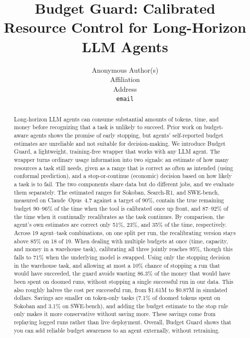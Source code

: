 \documentclass{article}
\title{Budget Guard: Calibrated Resource Control for Long-Horizon LLM Agents}
\author{
  Anonymous Author(s)\\
  Affiliation\\
  Address\\
  \texttt{email}
}
\begin{document}
\maketitle

\begin{abstract}
Long-horizon LLM agents can consume substantial amounts of tokens, time, and money before recognizing that a task is unlikely to succeed. Prior work on budget-aware agents shows the promise of early stopping, but agents' self-reported budget estimates are unreliable and not suitable for decision-making. We introduce Budget Guard, a lightweight, training-free wrapper that works with any LLM agent. The wrapper turns ordinary usage information into two signals: an estimate of how many resources a task still needs, given as a range that is correct as often as intended (using conformal prediction), and a stop-or-continue (economic) decision based on how likely a task is to fail. The two components share data but do different jobs, and we evaluate them separately. The estimated ranges for Sokoban, Search-R1, and SWE-bench, measured on Claude~Opus~4.7 against a target of 90\%, contain the true remaining budget 90--96\% of the time when the tool is calibrated once up front, and 87--92\% of the time when it continually recalibrates as the task continues. By comparison, the agent's own estimates are correct only 51\%, 23\%, and 35\% of the time, respectively. Across 19 agent--task combinations, on one split per run, the recalibrating version stays above 85\% on 18 of 19. When dealing with multiple budgets at once (time, capacity, and money in a warehouse task), calibrating all three jointly reaches 95\%, though this falls to 71\% when the underlying model is swapped. Using only the stopping decision in the warehouse task, and allowing at most a 10\% chance of stopping a run that would have succeeded, the guard avoids wasting 86.3\% of the money that would have been spent on doomed runs, without stopping a single successful run in our data. This also roughly halves the cost per successful run, from \$1.61M to \$0.87M in simulated dollars. Savings are smaller on token-only tasks (7.1\% of doomed tokens spent on Sokoban and 3.1\% on SWE-bench), and adding the budget estimate to the stop rule only makes it more conservative without saving more. These savings come from replaying logged runs rather than live deployment. Overall, Budget Guard shows that you can add reliable budget awareness to an agent externally, without retraining.
\end{abstract}
\end{document}
